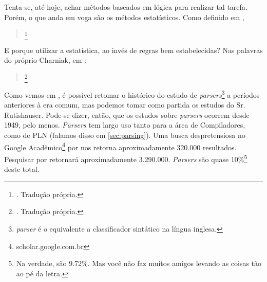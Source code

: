 Tenta-se, até hoje, achar métodos baseados em lógica para realizar tal tarefa. Porém, o que anda em voga são os métodos estatísticos. Como definido em ,
\begin{quote}
    \footnote{. Tradução própria.}
\end{quote}
E porque utilizar a estatística, ao invés de regras bem estabelecidas? Nas palavras do próprio Charniak, em :
\begin{quote}
    \footnote{. Tradução própria.}
\end{quote}
Como vemos em , é possível retomar o histórico do estudo de \textit{parsers}\footnote{\textit{\textit{parser}} é o equivalente a classificador sintático na língua inglesa.} a períodos anteriores à era comum,
mas podemos tomar como partida os estudos do Sr. Rutishauser. Pode-se dizer, então, que os estudos sobre \textit{parsers} ocorrem desde 1949, pelo menos.
\textit{Parsers} tem largo uso tanto para a área de Compiladores, como de PLN (falamos disso em \ref{sec:parsing}). Uma busca despretensiosa no Google Acadêmico\footnote{scholar.google.com.br} por  nos retorna aproximadamente 320.000 resultados. Pesquisar por  retornará aproximadamente 3.290.000. \textit{Parsers} são quase 10\%\footnote{Na verdade, são 9.72\%. Mas você não faz muitos amigos levando as coisas tão ao pé da letra.} deste total.

